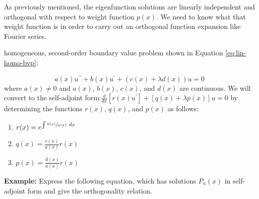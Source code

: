 As previously mentioned, the eigenfunction solutions are linearly independent and orthogonal with respect to weight function $p(x)$.  We need to know what that weight function is in order to carry out an orthogonal function expansion like Fourier series.  

 homogeneous, second-order boundary value problem shown in Equation \ref{eq:lin-homo-bvp}:

\begin{equation}
a(x)u^{\prime \prime} + b(x)u^{\prime} + (c(x) + \lambda d(x))u = 0
\label{eq:lin-homo-bvp}
\end{equation}
where $a(x) \ne 0$ and $a(x)$, $b(x)$, $c(x)$, and $d(x)$ are continuous.  We will convert to the self-adjoint form:$\frac{d}{dx}\left[r(x)u^{\prime}\right]+[q(x)+\lambda p(x)]u =0$ by determining the functions $r(x)$, $q(x)$, and $p(x)$ as follows:
\begin{enumerate}
\item $r(x) = e^{\int \sfrac{b(x)}{a(x)} \ dx}$
\item $q(x) = \frac{c(x)}{a(x)}r(x)$
\item $p(x) = \frac{d(x)}{a(x)}r(x)$
\end{enumerate}

\vspace{5.5cm}

\noindent\textbf{Example:} Express the following equation, which has solutions $P_n(x)$ in self-adjoint form and give the orthogonality relation.

